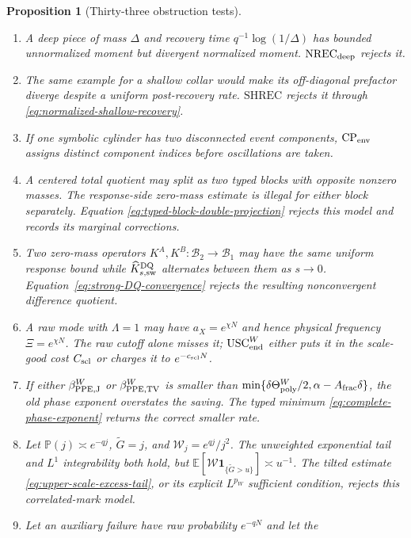 \documentclass[11pt]{article}
\newtheorem{proposition}[theorem]{Proposition}
\newcommand{\cB}{\mathcal B}
\newcommand{\one}{\mathbf 1}
\begin{document}
\begin{proposition}[Thirty-three obstruction tests]
\begin{enumerate}[label=\textup{(T\arabic*)}]
      the latter and never infers it from signed TV.
\item A deep piece of mass $\Delta$ and recovery time
      $q^{-1}\log(1/\Delta)$ has bounded unnormalized moment but divergent
      normalized moment.  $\mathrm{NREC}_{\rm deep}$ rejects it.
\item The same example for a shallow collar would make its off-diagonal
      prefactor diverge despite a uniform post-recovery rate.
      $\mathrm{SHREC}$ rejects it through
      \eqref{eq:normalized-shallow-recovery}.
\item If one symbolic cylinder has two disconnected event components,
      $\mathrm{CP}_{\rm env}$ assigns distinct component indices before
      oscillations are taken.
\item A centered total quotient may split as two typed blocks with opposite
      nonzero masses.  The response-side zero-mass estimate is illegal for
      either block separately.  Equation
      \eqref{eq:typed-block-double-projection} rejects this model and records
      its marginal corrections.
\item Two zero-mass operators $K^A,K^B:\cB_2\to\cB_1$ may have the same
      uniform response bound while
      $\widehat K_{s,\rm sw}^{\rm DQ}$ alternates between them as $s\to0$.
      Equation~\eqref{eq:strong-DQ-convergence} rejects the resulting
      nonconvergent difference quotient.
\item A raw mode with $\Lambda=1$ may have $a_X=e^{\chi N}$ and hence
      physical frequency $\Xi=e^{\chi N}$.  The raw cutoff alone misses it;
      $\mathrm{USC}_{\rm end}^{W}$ either puts it in the scale-good cost
      $C_{\rm scl}$ or charges it to $e^{-c_{\rm scl}N}$.
\item If either $\beta_{\rm PPE,J}^{W}$ or
      $\beta_{\rm PPE,TV}^{W}$ is smaller than
      $\min\{\delta\Theta_{\rm poly}^{W}/2,
      \alpha-A_{\rm frac}\delta\}$, the old phase exponent overstates the
      saving.  The typed minimum \eqref{eq:complete-phase-exponent} returns
      the correct smaller rate.
\item Let $\mathbb P(j)\asymp e^{-qj}$,
      $\widetilde G=j$, and $\mathscr W_j=e^{qj}/j^2$.  The unweighted
      exponential tail and $L^1$ integrability both hold, but
      $\mathbb E[\mathscr W\one_{\{\widetilde G>u\}}]\asymp u^{-1}$.
      The tilted estimate \eqref{eq:upper-scale-excess-tail}, or its explicit
      $L^{p_W}$ sufficient condition, rejects this correlated-mark model.
\item Let an auxiliary failure have raw probability $e^{-qN}$ and let the

\end{enumerate}
\end{proposition}
\end{document}
